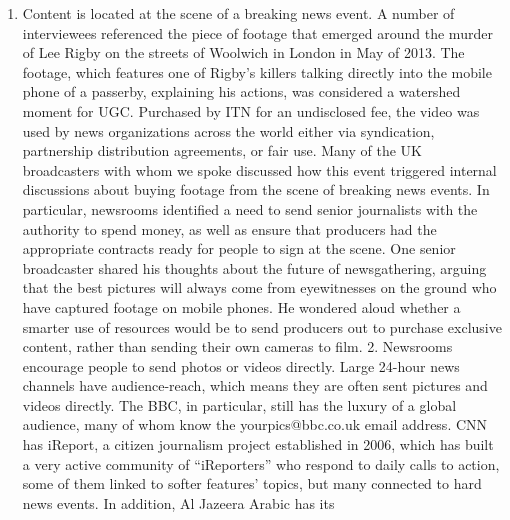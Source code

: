 \documentclass[symmetric, notoc, nobib]{towcenter-book}
\begin{document}
\begin{enumerate}
\item Content is located at the scene of a breaking news event.
A number of interviewees referenced the piece of footage that emerged
around the murder of Lee Rigby on the streets of Woolwich in London
in May of 2013. The footage, which features one of Rigby's killers talking
directly into the mobile phone of a passerby, explaining his actions, was
considered a watershed moment for UGC. Purchased by ITN for an undisclosed
fee, the video was used by news organizations across the world either
via syndication, partnership distribution agreements, or fair use. Many of
the UK broadcasters with whom we spoke discussed how this event triggered
internal discussions about buying footage from the scene of breaking
news events. In particular, newsrooms identified a need to send senior journalists
with the authority to spend money, as well as ensure that producers
had the appropriate contracts ready for people to sign at the scene. One
senior broadcaster shared his thoughts about the future of newsgathering,
arguing that the best pictures will always come from eyewitnesses on the
ground who have captured footage on mobile phones. He wondered aloud
whether a smarter use of resources would be to send producers out to purchase
exclusive content, rather than sending their own cameras to film.
2. Newsrooms encourage people to send photos or videos directly.
Large 24-hour news channels have audience-reach, which means they are
often sent pictures and videos directly. The BBC, in particular, still has the
luxury of a global audience, many of whom know the yourpics@bbc.co.uk
email address. CNN has iReport, a citizen journalism project established in
2006, which has built a very active community of ``iReporters'' who respond
to daily calls to action, some of them linked to softer features' topics, but
many connected to hard news events. In addition, Al Jazeera Arabic has its


\end{enumerate}
\end{document}
